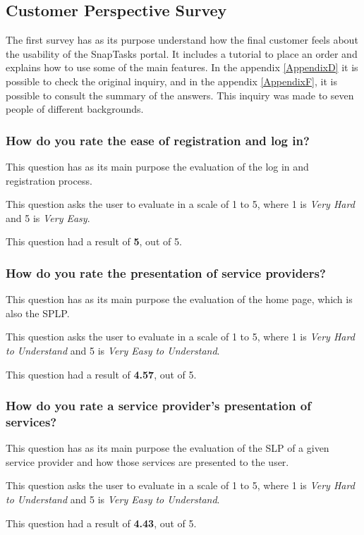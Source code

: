 \subsection{Customer Perspective Survey}
The first survey has as its purpose understand how the final customer feels about the usability of the SnapTasks portal. It includes a tutorial to place an order and explains how to use some of the  main features. In the appendix \ref{AppendixD} it is possible to check the original inquiry, and in the appendix \ref{AppendixF}, it is possible to consult the summary of the answers. This inquiry was made to seven people of different backgrounds.

\subsubsection{How do you rate the ease of registration and log in?}
This question has as its main purpose the evaluation of the log in and registration process. 
\par 
This question asks the user to evaluate in a scale of 1 to 5, where 1 is \textit{Very Hard} and 5 is \textit{Very Easy}. 
\par
This question had a result of \textbf{5}, out of 5. 


\subsubsection{How do you rate the presentation of service providers?}
This question has as its main purpose the evaluation of the home page, which is also the \gls{SPLP}. 
\par 
This question asks the user to evaluate in a scale of 1 to 5, where 1 is \textit{Very Hard to Understand} and 5 is \textit{Very Easy to Understand}. 
\par
This question had a result of \textbf{4.57}, out of 5. 

\subsubsection{How do you rate a service provider's presentation of services?}

This question has as its main purpose the evaluation of the \gls{SLP} of a given service provider and how those services are presented to the user. 
\par 
This question asks the user to evaluate in a scale of 1 to 5, where 1 is \textit{Very Hard to Understand} and 5 is \textit{Very Easy to Understand}. 
\par
This question had a result of \textbf{4.43}, out of 5. 

